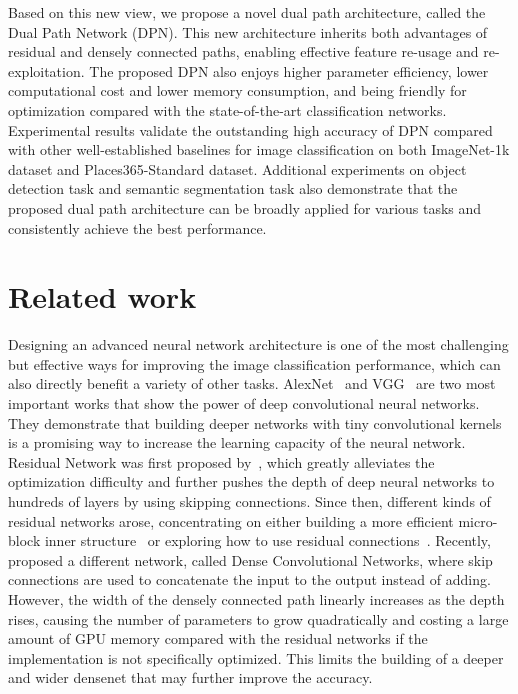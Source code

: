 \documentclass{article}
\begin{document}
Based on this new view, we propose a novel dual path architecture, called the Dual Path Network (DPN). This new architecture inherits both advantages of residual and densely connected paths, enabling effective feature re-usage and re-exploitation. The proposed DPN also enjoys higher parameter efficiency, lower computational cost and lower memory consumption, and being friendly for optimization compared with the state-of-the-art classification networks. Experimental results validate the outstanding high accuracy of DPN compared with other well-established baselines for image classification on both ImageNet-1k dataset and Places365-Standard dataset. Additional experiments on object detection task and semantic segmentation task also demonstrate that the proposed dual path architecture can be broadly applied for various tasks and consistently achieve the best performance. 



% 
%
%
%

\vskip -0.05in	
\section{Related work}
\vskip -0.05in	

Designing an advanced neural network architecture is one of the most challenging but effective ways for improving the image classification performance, which can also directly benefit a variety of other tasks. AlexNet~\citep{krizhevsky2012imagenet} and VGG~\citep{simonyan2014very} are two most important works that show the power of deep convolutional neural networks. They demonstrate that building deeper networks with tiny convolutional kernels is a promising way to increase the learning capacity of the neural network. Residual Network was first proposed by~\citet{he2016deep}, which greatly alleviates the optimization difficulty and further pushes the depth of deep neural networks to hundreds of layers by using skipping connections. Since then, different kinds of residual networks arose, concentrating on either building a more efficient micro-block inner structure~\citep{ypChen2017,xie2016aggregated} or exploring how to use residual connections~\citep{kim2016accurate}. Recently,~\citet{huang2016densely} proposed a different network, called Dense Convolutional Networks, where skip connections are used to concatenate the input to the output instead of adding. However, the width of the densely connected path linearly increases as the depth rises, causing the number of parameters to grow quadratically and costing a large amount of GPU memory compared with the residual networks if the implementation is not specifically optimized. This limits the building of a deeper and wider densenet that may further improve the accuracy.
\end{document}
